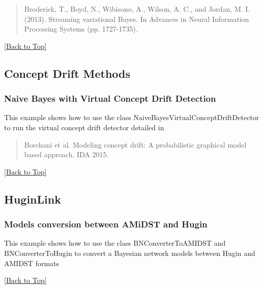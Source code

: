 \documentclass[10pt,a4paper]{article}
\begin{document}
\begin{quotation}
	Broderick, T., Boyd, N., Wibisono, A., Wilson, A. C., and Jordan, M. I. (2013). Streaming variational Bayes. In Advances in Neural Information Processing Systems (pp. 1727-1735).
\end{quotation}


\hyperref[sec:bns]{[Back to Top]}\newline 



\subsection{Concept Drift Methods}\label{sec:bns:conceptdrift}
\subsubsection{Naive Bayes with Virtual Concept Drift Detection}\label{sec:bns:conceptdrift:nbayes}
This example shows how to use the class NaiveBayesVirtualConceptDriftDetector to run the virtual concept drift detector detailed in
\begin{quotation}
Borchani et al. Modeling concept drift: A probabilistic graphical model based approach. IDA 2015.
\end{quotation}

\hyperref[sec:bns]{[Back to Top]}\newline 


\subsection{HuginLink}\label{sec:bns:huginlink}
\subsubsection{Models conversion between AMiDST and Hugin}\label{sec:bns:huginlink:conversion}
This example shows how to use the class BNConverterToAMIDST and BNConverterToHugin to convert a Bayesian network models between Hugin and AMIDST formats

\hyperref[sec:bns]{[Back to Top]}\newline 
\end{document}
